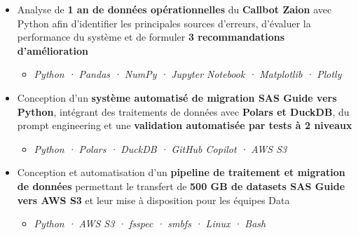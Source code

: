 \documentclass[10pt,english,french]{article}
\begin{document}
\vspace{-5pt}
\begin{itemize}[leftmargin=0.5cm, label=\textbullet, itemsep=0.05em]
    \item Analyse de \textbf{1 an de données opérationnelles} du \textbf{Callbot Zaion}
          avec Python afin d'identifier les principales sources d'erreurs,
          d'évaluer la performance du système et de formuler \textbf{3 recommandations d'amélioration}
          \begin{itemize}[leftmargin=0.25cm,label=\textendash,itemsep=0em,topsep=0.1em]
              \item \textit{\fontsize{10pt}{9pt}\selectfont Python · Pandas · NumPy · Jupyter Notebook · Matplotlib · Plotly}
          \end{itemize}

    \item Conception d'un \textbf{système automatisé de migration SAS Guide vers Python},
          intégrant des traitements de données avec \textbf{Polars et DuckDB},
          du prompt engineering et une \textbf{validation automatisée par tests à 2 niveaux}
          \begin{itemize}[leftmargin=0.25cm,label=\textendash,itemsep=0em,topsep=0.1em]
              \item \textit{\fontsize{10pt}{9pt}\selectfont Python · Polars · DuckDB · GitHub Copilot · AWS S3}
          \end{itemize}

    \item Conception et automatisation d'un \textbf{pipeline de traitement et migration de données}
          permettant le transfert de \textbf{500\raisebox{0.20ex}{\small +} GB de datasets SAS Guide vers AWS S3}
          et leur mise à disposition pour les équipes Data
          \begin{itemize}[leftmargin=0.25cm,label=\textendash,itemsep=0em,topsep=0.1em]
              \item \textit{\fontsize{10pt}{9pt}\selectfont Python · AWS S3 · fsspec · smbfs · Linux · Bash}
          \end{itemize}



\end{itemize}
\end{document}

